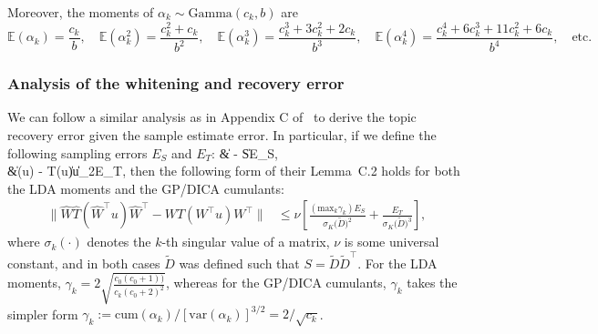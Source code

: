 \documentclass{article}
\makeatletter
\newenvironment{ma}
  {\start@align\@ne\st@rredtrue\m@ne}
  {\endalign}
\newcommand{\norm}[1]{\left\|#1\right\|}
\newcommand{\normp}[1]{\|#1\|}
\newcommand{\sbra}[1]{\left[#1\right]}
\newcommand{\wt}[1]{\widetilde{#1}}
\newcommand{\wh}[1]{\widehat{#1}}
\newcommand{\ga}{\alpha}
\newcommand{\ebb}{\mathbb{E}}
\newcommand{\var}{\mathrm{var}}
\newcommand{\cum}{\mathrm{cum}}
\newcommand{\gam}{\mathrm{Gamma}}
\makeatother
\begin{document}
Moreover, the moments of $\ga_k\sim\gam(c_k,b)$ are
$$
\ebb(\ga_k) = \frac{c_k}{b},\quad \ebb(\ga_k^2) = \frac{c_k^2 + c_k}{b^2}, \quad \ebb(\ga_k^3) = \frac{c_k^3 + 3 c_k^2 + 2 c_k}{b^3}, \quad \ebb(\ga_k^4) = \frac{c_k^4 + 6c_k^3 + 11c_k^2 + 6c_k}{b^4},\quad\mbox{etc.}
$$



\subsubsection{Analysis of the whitening and recovery error}\label{section-analysis-of-whitening}
We can follow a similar analysis as in Appendix C of~\cite{AnaEtAl2013} to derive the topic recovery error given the sample estimate error. In particular, if we define the following sampling errors $E_S$ and $E_T$:
\begin{ma}
&\normp{\wh{S} - S}  \le E_S,\\
&\normp{\wh{T}(u) - T(u)} \le \norm{u}_2E_T,
\end{ma}
then the following form of their Lemma~C.2 holds for both the LDA moments and the GP/DICA cumulants: 
\begin{equation}
\label{analysis-whitening-bound}
\begin{aligned}
\normp{\wh{W} \wh{T}(\wh{W}^{\top}u) \wh{W}^{\top} - WT(W^{\top} u)W^{\top}} &\le \nu\sbra{  \frac{(\mathrm{max}_k \gamma_k) E_S }{\sigma_K \big(\wt{D}\big)^2} + \frac{E_T}{\sigma_K\big(\wt{D}\big)^3} },
\end{aligned}
\end{equation}
where $\sigma_k(\cdot)$ denotes the $k$-th singular value of a matrix, $\nu$ is some universal constant, and in both cases $\wt{D}$ was defined such that $S = \wt{D} \wt{D}^\top$. For the LDA moments, $\gamma_k = 2 \sqrt{ \frac{c_0 (c_0+1))}{c_k (c_0+2)^2 }}$, whereas for the GP/DICA cumulants, $\gamma_k$ takes the simpler form $\gamma_k := \cum(\ga_k)/[\var(\ga_k)]^{3/2}=2/\sqrt{c_k}$.
\end{document}
